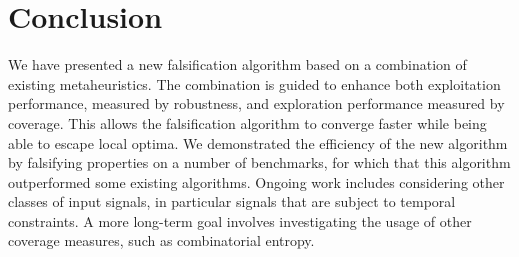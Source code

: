 \section{Conclusion}
We have presented a new falsification algorithm based on a combination of existing metaheuristics.
The combination is guided to enhance both exploitation performance, measured by robustness, and exploration performance measured by coverage.
This allows the falsification algorithm to converge faster while being able to escape local optima. 
We demonstrated the efficiency of the new algorithm by falsifying
properties on a number of benchmarks, for which that this algorithm outperformed some existing algorithms. Ongoing work includes considering other classes of input signals, in particular signals that are subject to temporal constraints. A more long-term goal involves 
investigating the usage of other coverage measures, such as combinatorial entropy. 
